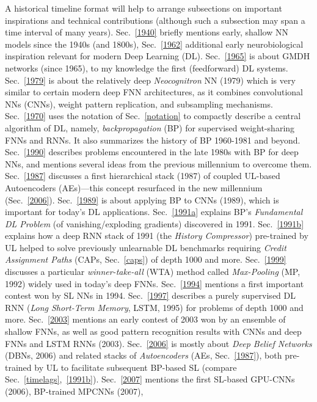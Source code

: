 \documentclass[letterpaper]{article}
\begin{document}
\begin{CJK*}{UTF8}{gbsn}
A historical timeline format will help to arrange 
subsections on
important inspirations and technical contributions
(although such a subsection may span a time interval of many years).
Sec.~\ref{1940} briefly mentions early, shallow NN models since the 1940s (and 1800s),
Sec.~\ref{1962} additional early neurobiological inspiration relevant for modern Deep Learning (DL).
Sec.~\ref{1965} is about GMDH networks  (since 1965), 
to my knowledge the first (feedforward) DL systems.
Sec.~\ref{1979} is about the relatively deep {\em Neocognitron} NN (1979)
which is very similar to certain modern deep FNN architectures, as it
combines convolutional NNs (CNNs), weight pattern replication, and subsampling mechanisms.
Sec.~\ref{1970} uses the notation of Sec.~\ref{notation} to compactly 
describe a central algorithm of DL, namely,
{\em backpropagation} (BP) for 
supervised weight-sharing FNNs and RNNs. It also summarizes
 the history of BP 1960-1981 and beyond.
Sec.~\ref{1990} describes problems encountered in the late 1980s with BP for deep NNs,
and mentions several ideas from the previous millennium  to overcome them.
Sec.~\ref{1987} discusses a first hierarchical stack (1987) of coupled UL-based Autoencoders (AEs)---this concept
resurfaced in the
new millennium (Sec.~\ref{2006}). 
Sec.~\ref{1989} is about applying BP to CNNs (1989), which is important for today's DL applications.
Sec.~\ref{1991a} explains BP's {\em Fundamental DL Problem} (of vanishing/exploding gradients)
discovered in 1991.
Sec.~\ref{1991b} explains how a deep RNN stack of 1991 (the {\em History Compressor}) pre-trained by UL helped to solve previously unlearnable DL benchmarks 
requiring {\em Credit Assignment Paths} (CAPs, Sec.~\ref{caps}) of depth 1000 and more.
Sec.~\ref{1999} discusses a particular {\em winner-take-all} (WTA) method called {\em Max-Pooling} (MP, 1992)  widely used in today's deep FNNs.
Sec.~\ref{1994} mentions a first important contest won by SL NNs in 1994.
Sec.~\ref{1997} describes a purely supervised DL RNN ({\em Long Short-Term Memory}, LSTM, 1995) for problems of depth 1000 and more.
Sec.~\ref{2003} mentions an early contest of 2003 
won by an ensemble of shallow FNNs, as well as
good pattern recognition results with CNNs and deep FNNs and LSTM RNNs (2003). 
Sec.~\ref{2006} is mostly about {\em Deep Belief Networks} (DBNs, 2006) and related stacks of {\em  Autoencoders} (AEs, Sec.~\ref{1987}), both pre-trained by UL to facilitate subsequent BP-based SL (compare Sec.~\ref{timelags},~\ref{1991b}). 
Sec.~\ref{2007} mentions the first SL-based  GPU-CNNs (2006),  BP-trained MPCNNs (2007),

\end{CJK*}
\end{document}
